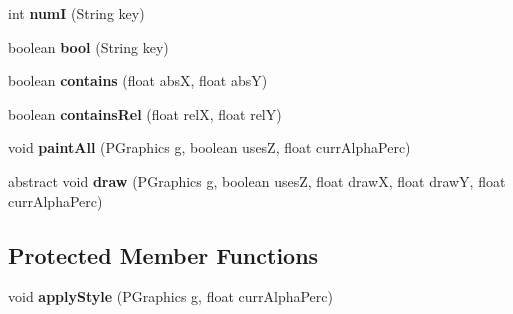 \begin{DoxyCompactItemize}
\item 
\hypertarget{classhype_1_1drawable_1_1_h_drawable_a78a4cb7304e24e1706d9f23d0a387b43}{int {\bfseries num\-I} (String key)}\label{classhype_1_1drawable_1_1_h_drawable_a78a4cb7304e24e1706d9f23d0a387b43}

\item 
\hypertarget{classhype_1_1drawable_1_1_h_drawable_a138a8d2253dbfccb39889cb01b452f7c}{boolean {\bfseries bool} (String key)}\label{classhype_1_1drawable_1_1_h_drawable_a138a8d2253dbfccb39889cb01b452f7c}

\item 
\hypertarget{classhype_1_1drawable_1_1_h_drawable_a6662671b3f2c3f96cdd8883e0eb21fd6}{boolean {\bfseries contains} (float abs\-X, float abs\-Y)}\label{classhype_1_1drawable_1_1_h_drawable_a6662671b3f2c3f96cdd8883e0eb21fd6}

\item 
\hypertarget{classhype_1_1drawable_1_1_h_drawable_a40eaa02f8f52fc6891d77affe8b8f146}{boolean {\bfseries contains\-Rel} (float rel\-X, float rel\-Y)}\label{classhype_1_1drawable_1_1_h_drawable_a40eaa02f8f52fc6891d77affe8b8f146}

\item 
\hypertarget{classhype_1_1drawable_1_1_h_drawable_a54e5a75afb23f49b37ce769a11d10fb0}{void {\bfseries paint\-All} (P\-Graphics g, boolean uses\-Z, float curr\-Alpha\-Perc)}\label{classhype_1_1drawable_1_1_h_drawable_a54e5a75afb23f49b37ce769a11d10fb0}

\item 
\hypertarget{classhype_1_1drawable_1_1_h_drawable_a8e0af2cfaa89a93b3dab6b5f0ecdf964}{abstract void {\bfseries draw} (P\-Graphics g, boolean uses\-Z, float draw\-X, float draw\-Y, float curr\-Alpha\-Perc)}\label{classhype_1_1drawable_1_1_h_drawable_a8e0af2cfaa89a93b3dab6b5f0ecdf964}

\end{DoxyCompactItemize}
\subsection*{Protected Member Functions}
\begin{DoxyCompactItemize}
\item 
\hypertarget{classhype_1_1drawable_1_1_h_drawable_a1888aed57c719a397222b9e82ed08a4e}{void {\bfseries apply\-Style} (P\-Graphics g, float curr\-Alpha\-Perc)}\label{classhype_1_1drawable_1_1_h_drawable_a1888aed57c719a397222b9e82ed08a4e}

\end{DoxyCompactItemize}
